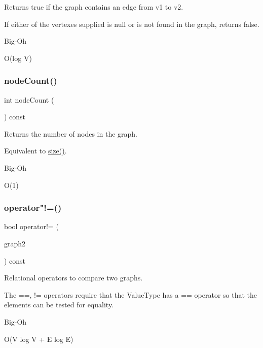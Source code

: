 Returns true if the graph contains an edge from v1 to v2. 

If either of the vertexes supplied is null or is not found in the graph, returns false. \begin{DoxyRefDesc}{Big-\/\+Oh}
\item[\mbox{\hyperlink{BigOh__BigOh000081}{Big-\/\+Oh}}]O(log V) \end{DoxyRefDesc}
\mbox{\label{classGraph_a5dd1afdb4e1c75fbe51976bf6f70c922}} 
\subsubsection{\texorpdfstring{node\+Count()}{nodeCount()}}
{\footnotesize\ttfamily int node\+Count (\begin{DoxyParamCaption}{ }\end{DoxyParamCaption}) const}



Returns the number of nodes in the graph. 

Equivalent to \mbox{\hyperlink{classGraph_af9593d4a5ff4274efaf429cb4f9e57cc}{size()}}. \begin{DoxyRefDesc}{Big-\/\+Oh}
\item[\mbox{\hyperlink{BigOh__BigOh000083}{Big-\/\+Oh}}]O(1) \end{DoxyRefDesc}
\mbox{\label{classGraph_aafd8d1cec3a4d6b8cdcb58016e4d093a}} 
\subsubsection{\texorpdfstring{operator"!=()}{operator!=()}}
{\footnotesize\ttfamily bool operator!= (\begin{DoxyParamCaption}\item[{const \mbox{\hyperlink{classGraph}{Graph}}$<$ Node\+Type, Arc\+Type $>$ \&}]{graph2 }\end{DoxyParamCaption}) const}



Relational operators to compare two graphs. 

The ==, != operators require that the Value\+Type has a == operator so that the elements can be tested for equality. \begin{DoxyRefDesc}{Big-\/\+Oh}
\item[\mbox{\hyperlink{BigOh__BigOh000094}{Big-\/\+Oh}}]O(V log V + E log E) \end{DoxyRefDesc}
\mbox{\label{classGraph_a1daf423faecc777e29a399812dc39ca2}} 
